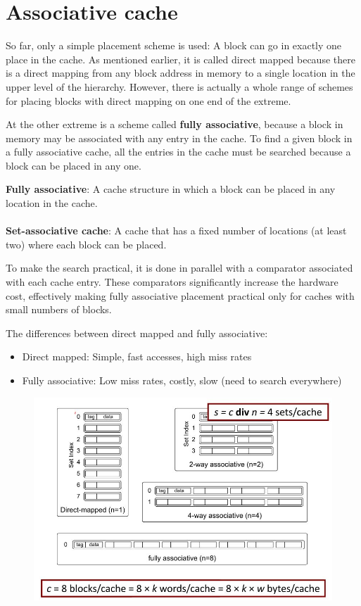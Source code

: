 \documentclass[10pt,a4paper]{article}
\begin{document}
\section{Associative cache}

So far, only a simple placement scheme is used: A block can go in exactly one place in the cache. As mentioned earlier, it is called direct mapped because there is a direct mapping from any block address in memory to a single location in the upper level of the hierarchy. However, there is actually a 
whole range of schemes for placing blocks with direct mapping on one end of the extreme.

At the other extreme is a scheme called \textbf{fully associative}, because a block in memory may be
associated with any entry in the cache. To find a given block in a fully associative cache, all the
entries in the cache must be searched because a block can be placed in any one.

\begin{tcolorbox}[breakable,colback=white]
\textbf{Fully associative}: A cache structure in which a block can be placed in any location in the
cache.
\\
\\
\textbf{Set-associative cache}: A cache that has a fixed number of locations (at least two) where each 
block can be placed.
\end{tcolorbox}

To make the search practical, it is done in parallel with a comparator associated with each cache
entry. These comparators significantly increase the hardware cost, effectively making fully
associative placement practical only for caches with small numbers of blocks.

The differences between direct mapped and fully associative:
\begin{itemize}
    \item Direct mapped: Simple, fast accesses, high miss rates
    \item Fully associative: Low miss rates, costly, slow (need to search everywhere)
\end{itemize}

\begin{figure} [h!]
    \centering
    \includegraphics[scale=0.6]{cache1.JPG}
\end{figure}













\end{document}
